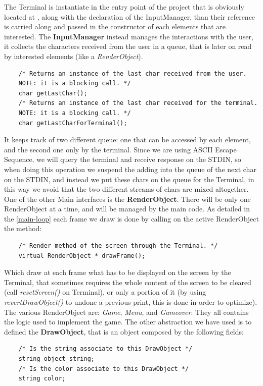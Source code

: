 \documentclass{article}
\begin{document}
The Terminal is instantiate in the entry point of the project that is obviously located at , along with the declaration of the InputManager, than their reference is carried along and passed in the constructor of each
elements that are interested.
The \textbf{InputManager} instead manages the interactions with the user, it collects the characters received from the user in a queue, that is later on read by interested elements (like a \textit{RenderObject}).
\begin{verbatim}
    /* Returns an instance of the last char received from the user.
    NOTE: it is a blocking call. */
    char getLastChar();
    /* Returns an instance of the last char received for the terminal.
    NOTE: it is a blocking call. */
    char getLastCharForTerminal();
\end{verbatim}
It keeps track of two different queue: one that can be accessed by each element, and the second one only by the terminal. Since we are using ASCII Escape Sequence, we will query the terminal and receive response on the STDIN, so when doing this operation we suspend the adding into the queue of the next char on the STDIN,
and instead we put these chars on the queue for the Terminal, in this way we avoid that the two different streams of chars are mixed altogether.
One of the other Main interfaces is the \textbf{RenderObject}. There will be only one RenderObject at a time, and will be managed by the main code.
As detailed in the \ref{main-loop} each frame we draw is done by calling on the active RenderObject the method:
\begin{verbatim}
    /* Render method of the screen through the Terminal. */
    virtual RenderObject * drawFrame();
\end{verbatim}
Which draw at each frame what has to be displayed on the screen by the Terminal, that sometimes requires the whole content of the screen to be cleared (call \textit{resetScreen()} on Terminal), or only a portion of it (by using \textit{revertDrawObject()} to undone a previous print, this is done in order to optimize).
The various RenderObject are: \textit{Game}, \textit{Menu}, and \textit{Gameover}.
They all contains the logic used to implement the game.
The other abstraction we have used is to defined the \textbf{DrawObject}, that is an object composed by the following fields:
\begin{verbatim}
    /* Is the string associate to this DrawObject */
    string object_string;
    /* Is the color associate to this DrawObject */
    string color;
\end{verbatim}
\end{document}
